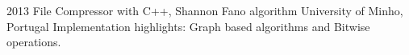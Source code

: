 \documentclass[]{friggeri-cv} %
\begin{document}
\begin{entrylist}


\entry
{2013}
{File Compressor with C++, Shannon Fano algorithm}
{University of Minho, Portugal}
{Implementation highlights: Graph based algorithms and Bitwise operations.
}
\end{entrylist}
\end{document}

